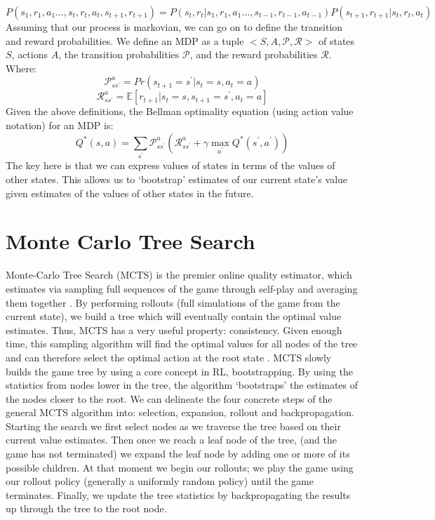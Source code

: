 \documentclass[msc, deptreport, ai, romanprepages]{infthesis}
\begin{document}
\begin{equation}
P(s_1, r_1, a_1 \ldots , s_t, r_t, a_t, s_{t+1}, r_{t+1}) = P(s_t, r_t | s_1, r_1, a_1 \ldots , s_{t-1}, r_{t-1}, a_{t-1}) P(s_{t+1}, r_{t+1} | s_t, r_t, a_t)
\end{equation}
Assuming that our process is markovian, we can go on to define the transition and reward probabilities. We define an MDP as a tuple \(<S,A,\mathcal{P},\mathcal{R}>\) of states \(S\), actions \(A\), the transition probabilities \(\mathcal{P}\), and the reward probabilities \(\mathcal{R}\). Where:
\begin{equation}
\mathcal{P}_{s{s^\prime}}^a = Pr(s_{t+1} = {s^\prime} | s_t = s, a_t = a)
\end{equation}
\begin{equation}
\mathcal{R}_{s{s^\prime}}^a = \mathbb{E}[r_{t+1} | s_t = s, s_{t+1} = {s^\prime}, a_t = a]
\end{equation}
Given the above definitions, the Bellman optimality equation (using action value notation) for an MDP is:
\begin{equation}
Q^*(s,a) = \sum_{s^\prime} \mathcal{P}_{s{s^\prime}}^a (\mathcal{R}_{s{s^\prime}}^a + \gamma \max_{a^\prime} Q^*({s^\prime}, {a^\prime}))
\end{equation}
The key here is that we can express values of states in terms of the values of other states. This allows us to `bootstrap' estimates of our current state's value given estimates of the values of other states in the future. 

\section{Monte Carlo Tree Search}
Monte-Carlo Tree Search (MCTS) is the premier online quality estimator, which estimates via sampling full sequences of the game through self-play and averaging them together \cite{Gelly}. By performing rollouts (full simulations of the game from the current state), we build a tree which will eventually contain the optimal value estimates. Thus, MCTS has a very useful property: consistency. Given enough time, this sampling algorithm will find the optimal values for all nodes of the tree and can therefore select the optimal action at the root state \cite{Gelly}. MCTS slowly builds the game tree by using a core concept in RL, bootstrapping. By using the statistics from nodes lower in the tree, the algorithm `bootstraps' the estimates of the nodes closer to the root. We can delineate the four concrete steps of the general MCTS algorithm into: selection, expansion, rollout and backpropagation. Starting the search we first select nodes as we traverse the tree based on their current value estimates. Then once we reach a leaf node of the tree, (and the game has not terminated) we expand the leaf node by adding one or more of its possible children. At that moment we begin our rollouts; we play the game using our rollout policy (generally a uniformly random policy) until the game terminates. Finally, we update the tree statistics by backpropagating the results up through the tree to the root node. 
\end{document}

